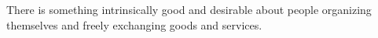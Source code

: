 There is something intrinsically good and desirable about people organizing themselves and freely exchanging goods and services.